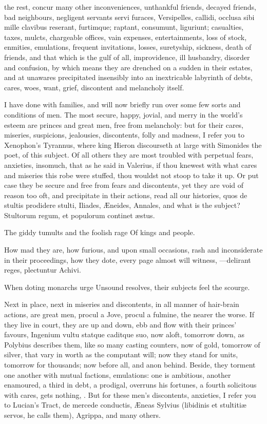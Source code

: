 {the rest, concur many other inconveniences, unthankful friends, decayed
friends, bad neighbours, negligent servants servi furaces,
Versipelles, callidi, occlusa sibi mille clavibus reserant, furtimque;
raptant, consumunt, liguriunt; casualties, taxes, mulcts, chargeable
offices, vain expenses, entertainments, loss of stock, enmities,
emulations, frequent invitations, losses, suretyship, sickness, death
of friends, and that which is the gulf of all, improvidence, ill
husbandry, disorder and confusion, by which means they are drenched on
a sudden in their estates, and at unawares precipitated insensibly into
an inextricable labyrinth of debts, cares, woes, want, grief,
discontent and melancholy itself.

I have done with families, and will now briefly run over some few sorts
and conditions of men. The most secure, happy, jovial, and merry in the
world's esteem are princes and great men, free from melancholy: but for
their cares, miseries, suspicions, jealousies, discontents, folly and
madness, I refer you to Xenophon's Tyrannus, where king Hieron
discourseth at large with Simonides the poet, of this subject. Of all
others they are most troubled with perpetual fears, anxieties,
insomuch, that as he said in Valerius, if thou knewest with what
cares and miseries this robe were stuffed, thou wouldst not stoop to
take it up. Or put case they be secure and free from fears and
discontents, yet they are void of reason too oft, and precipitate
in their actions, read all our histories, quos de stultis prodidere
stulti, Iliades, \AE{}neides, Annales, and what is the subject?
Stultorum regum, et populorum continet \ae{}stus.

The giddy tumults and the foolish rage
Of kings and people.

How mad they are, how furious, and upon small occasions, rash and
inconsiderate in their proceedings, how they dote, every page almost
will witness,
---delirant reges, plectuntur Achivi.

When doting monarchs urge
Unsound resolves, their subjects feel the scourge.

Next in place, next in miseries and discontents, in all manner of
hair-brain actions, are great men, procul a Jove, procul a fulmine, the
nearer the worse. If they live in court, they are up and down, ebb and
flow with their princes' favours, Ingenium vultu statque caditque suo,
now aloft, tomorrow down, as Polybius describes them, like so many
casting counters, now of gold, tomorrow of silver, that vary in worth
as the computant will; now they stand for units, tomorrow for
thousands; now before all, and anon behind. Beside, they torment one
another with mutual factions, emulations: one is ambitious, another
enamoured, a third in debt, a prodigal, overruns his fortunes, a fourth
solicitous with cares, gets nothing, \etc{}. But for these men's
discontents, anxieties, I refer you to Lucian's Tract, de mercede
conductis, \AE{}neas Sylvius (libidinis et stultiti\ae{} servos, he
calls them), Agrippa, and many others.

}
